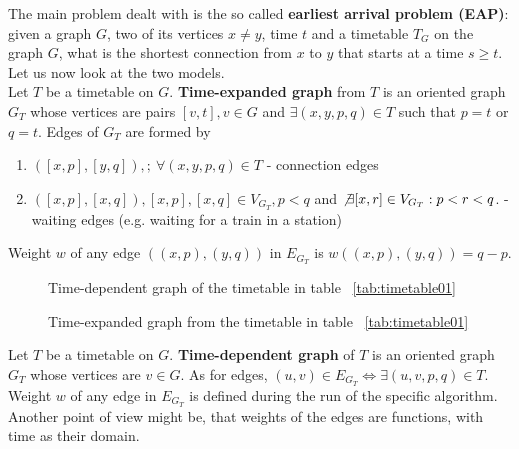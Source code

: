 \documentclass[a4paper]{article}
\newcommand{\inputTikZ}[1]{%
  }
\newcommand{\inputTikZ}[1]{%
    \beginpgfgraphicnamed{#1-external}%
    \endpgfgraphicnamed%
  }
\begin{document}
        The main problem dealt with is the so called \def\defeap{\textbf{earliest arrival problem (EAP)}: given a graph $G$, two of its vertices $x \neq y$, time $t$ and a timetable $T_{G}$ on the graph $G$, what is the shortest connection from $x$ to $y$ that starts at a time $s \geq t$. }\defeap Let us now look at the two models. \\

        \def\deftimeexpanded{Let $T$ be a timetable on $G$. \textbf{Time-expanded graph} from $T$ is an oriented graph $G_{T}$ whose vertices are pairs $[v, t], v \in G$ and $\exists (x, y, p, q) \in T$ such that $p = t$ or $q = t$. Edges of $G_{T}$ are formed by
        \begin{enumerate}
            \item $([x, p], [y, q]), ;\ \forall (x, y, p, q) \in T$ - connection edges
            \item $([x, p], [x, q]), [x, p], [x, q] \in V_{G_{T}}, p < q$ and $\not \exists [x, r] \in V_{G_{T}}: p < r < q$. - waiting edges (e.g. waiting for a train in a station)
        \end{enumerate}
        Weight $w$ of any edge $((x, p), (y, q))$ in $E_{G_{T}}$ is $w((x, p), (y, q)) = q - p$.}\deftimeexpanded \\

        \begin{figure}[h!]
            \scriptsize
            \begin{center}
                \inputTikZ{./tikzpics/timedependent}
            \end{center}
            \caption{\label{fig:timeexp01} Time-dependent graph of the timetable in table ~\ref{tab:timetable01}}
        \end{figure}

        \begin{figure}[h!]
            \scriptsize
            \begin{center}
                \inputTikZ{./tikzpics/timeexpanded}
            \end{center}
            \caption{\label{fig:timeexp01} Time-expanded graph from the timetable in table ~\ref{tab:timetable01}}
        \end{figure}

        \def\deftimedependent{Let $T$ be a timetable on $G$. \textbf{Time-dependent graph} of $T$ is an oriented graph $G_{T}$ whose vertices are $v \in G$. As for edges, $(u, v) \in E_{G_{T}} \iff \exists (u, v, p, q) \in T$. Weight $w$ of any edge in $E_{G_{T}}$ is defined during the run of the specific algorithm. }\deftimedependent Another point of view might be, that weights of the edges are functions, with time as their domain. \\
\end{document}

